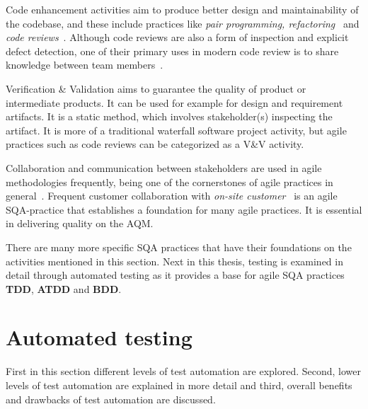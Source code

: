    Code enhancement activities aim to produce better design and maintainability of the codebase, and these include practices
    like \textit{pair programming, refactoring}~\cite{huo2004software} and \textit{code reviews}~\cite{rigby2013convergent}.
    Although code reviews are also a form of inspection and explicit defect detection, one of their primary uses in modern
    code review is to share knowledge between team members~\cite{mantyla2014software,rigby2013convergent}.

    Verification \& Validation aims to guarantee the quality of product or intermediate products. It can be used for
    example for design and requirement artifacts. It is a static method, which involves stakeholder(s)
    inspecting the artifact. It is more of a traditional waterfall software project activity, but agile practices such as code reviews
    can be categorized as a V\&V activity. ~\cite{huo2004software}

    Collaboration and communication between stakeholders are used in agile methodologies frequently, being one of the
    cornerstones of agile practices in general~\cite{huo2004software}. Frequent customer collaboration with \textit{on-site customer}~\cite{huo2004software}
    is an agile SQA-practice that establishes a foundation for many agile practices. It is essential in delivering
    quality on the AQM.

    There are many more specific SQA practices that have their foundations on the activities mentioned in this section.
    Next in this thesis, testing is examined in detail through automated testing as it provides a base for agile SQA practices \textbf{TDD},
    \textbf{ATDD} and \textbf{BDD}.

\section{Automated testing}
    First in this section different levels of test automation are explored. Second, lower levels of test automation are explained in more
    detail and third, overall benefits and drawbacks of test automation are discussed.

